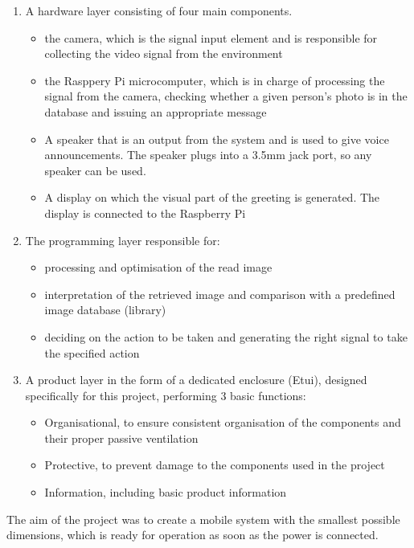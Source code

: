 \documentclass[a4paper,12pt,reqno]{article}
\begin{document}
\begin{enumerate} %
  \item A hardware layer consisting of four main components.
  \begin{itemize}
  	\item the camera, which is the signal input element and is responsible for collecting the video signal from the environment
  	\item the Rasppery Pi microcomputer, which is in charge of processing the signal from the camera, checking whether a given person's photo is in the database and issuing an appropriate message
  	\item A speaker that is an output from the system and is used to give voice announcements. The speaker plugs into a 3.5mm jack port, so any speaker can be used.
  	\item A display on which the visual part of the greeting is generated. The display is connected to the Raspberry Pi
  \end{itemize}
  \item The programming layer responsible for:
  \begin{itemize}
  	\item processing and optimisation of the read image
  	\item interpretation of the retrieved image and comparison with a predefined image database (library)
  	\item deciding on the action to be taken and generating the right signal to take the specified action
  \end{itemize}
  \item A product layer in the form of a dedicated enclosure (Etui), designed specifically for this project, performing 3 basic functions:
  \begin{itemize}
  	\item Organisational, to ensure consistent organisation of the components and their proper passive ventilation
  	\item Protective, to prevent damage to the components used in the project
  	\item Information, including basic product information
  \end{itemize}
\end{enumerate}
The aim of the project was to create a mobile system with the smallest possible dimensions, which is ready for operation as soon as the power is connected.


\newpage
\end{document}
